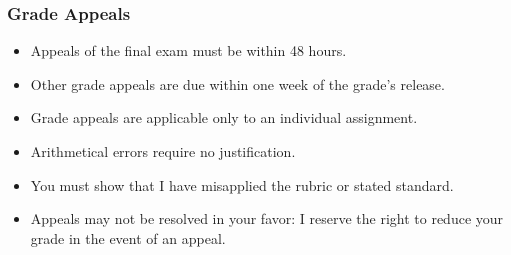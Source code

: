 \begin{frame}
  \frametitle{Grade Appeals}

  \begin{itemize}
  \item Appeals of the final exam must be within 48 hours.
  \item Other grade appeals are due within one week of the grade's release.
  \item Grade appeals are applicable only to an individual assignment.
  \item Arithmetical errors require no justification.
  \item You must show that I have misapplied the rubric or stated standard.
  \item Appeals may not be resolved in your favor: I reserve the right to reduce your grade in the event of an appeal.
  \end{itemize}
  
\end{frame}
